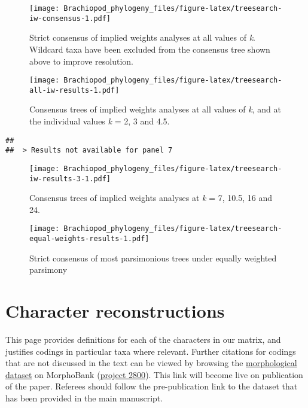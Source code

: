 \documentclass[openany]{book}
\theoremstyle{definition}
\theoremstyle{definition}
\theoremstyle{definition}
\theoremstyle{remark}
\begin{document}
\begin{figure}
\centering
\texttt{[image: Brachiopod\_phylogeny\_files/figure-latex/treesearch-iw-consensus-1.pdf]}
\caption{\label{fig:treesearch-iw-consensus}Strict consensus of implied weights analyses at all
values of \emph{k}. Wildcard taxa have been excluded from the consensus
tree shown above to improve resolution.}
\end{figure}








\clearpage 

\begin{figure}
\centering
\texttt{[image: Brachiopod\_phylogeny\_files/figure-latex/treesearch-all-iw-results-1.pdf]}
\caption{\label{fig:treesearch-all-iw-results}Consensus trees of implied weights analyses
at all values of \emph{k}, and at the individual
values \emph{k} = 2, 3 and 4.5.}
\end{figure}

\clearpage 

\begin{verbatim}
## 
##  > Results not available for panel 7
\end{verbatim}

\begin{figure}
\centering
\texttt{[image: Brachiopod\_phylogeny\_files/figure-latex/treesearch-iw-results-3-1.pdf]}
\caption{\label{fig:treesearch-iw-results-3}Consensus trees of implied weights analyses
at \emph{k} = 7, 10.5, 16 and 24.}
\end{figure}

\clearpage

\begin{figure}
\centering
\texttt{[image: Brachiopod\_phylogeny\_files/figure-latex/treesearch-equal-weights-results-1.pdf]}
\caption{\label{fig:treesearch-equal-weights-results}Strict consensus of
most parsimonious trees under equally weighted parsimony}
\end{figure}

\clearpage

\hypertarget{reconstructions}{\chapter{Character
reconstructions}\label{reconstructions}}

This page provides definitions for each of the characters in our matrix,
and justifies codings in particular taxa where relevant. Further
citations for codings that are not discussed in the text can be viewed
by browsing the \protect\hyperlink{dataset}{morphological dataset} on
MorphoBank (\href{https://morphobank.org/permalink/?P2800}{project
2800}). This link will become live on publication of the paper. Referees
should follow the pre-publication link to the dataset that has been
provided in the main manuscript.
\end{document}
